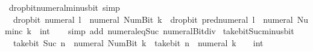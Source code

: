 \begin{isabellebody}
\endisatagproof
{\isafoldproof}%
%
\isadelimproof
\isanewline
%
\endisadelimproof
\isanewline
{}\isamarkupfalse%
\ drop{\isacharunderscore}{\kern0pt}bit{\isacharunderscore}{\kern0pt}numeral{\isacharunderscore}{\kern0pt}minus{\isacharunderscore}{\kern0pt}bit{}\ {\isacharbrackleft}{\kern0pt}simp{\isacharbrackright}{\kern0pt}{\isacharcolon}{\kern0pt}\isanewline
\ \ {\isacartoucheopen}drop{\isacharunderscore}{\kern0pt}bit\ {\isacharparenleft}{\kern0pt}numeral\ l{\isacharparenright}{\kern0pt}\ {\isacharparenleft}{\kern0pt}{\isacharminus}{\kern0pt}\ numeral\ {\isacharparenleft}{\kern0pt}Num{\isachardot}{\kern0pt}Bit{}\ k{\isacharparenright}{\kern0pt}{\isacharparenright}{\kern0pt}\ {\isacharequal}{\kern0pt}\ drop{\isacharunderscore}{\kern0pt}bit\ {\isacharparenleft}{\kern0pt}pred{\isacharunderscore}{\kern0pt}numeral\ l{\isacharparenright}{\kern0pt}\ {\isacharparenleft}{\kern0pt}{\isacharminus}{\kern0pt}\ numeral\ {\isacharparenleft}{\kern0pt}Num{\isachardot}{\kern0pt}inc\ k{\isacharparenright}{\kern0pt}\ {\isacharcolon}{\kern0pt}{\isacharcolon}{\kern0pt}\ int{\isacharparenright}{\kern0pt}{\isacartoucheclose}\isanewline
%
\isadelimproof
\ \ %
\endisadelimproof
%
\isatagproof
{}\isamarkupfalse%
\ {\isacharparenleft}{\kern0pt}simp\ add{\isacharcolon}{\kern0pt}\ numeral{\isacharunderscore}{\kern0pt}eq{\isacharunderscore}{\kern0pt}Suc\ numeral{\isacharunderscore}{\kern0pt}Bit{}{\isacharunderscore}{\kern0pt}div{\isacharunderscore}{\kern0pt}{}{\isacharparenright}{\kern0pt}%
\endisatagproof
{\isafoldproof}%
%
\isadelimproof
\isanewline
%
\endisadelimproof
\isanewline
{}\isamarkupfalse%
\ take{\isacharunderscore}{\kern0pt}bit{\isacharunderscore}{\kern0pt}Suc{\isacharunderscore}{\kern0pt}minus{\isacharunderscore}{\kern0pt}bit{}{\isacharcolon}{\kern0pt}\isanewline
\ \ {\isacartoucheopen}take{\isacharunderscore}{\kern0pt}bit\ {\isacharparenleft}{\kern0pt}Suc\ n{\isacharparenright}{\kern0pt}\ {\isacharparenleft}{\kern0pt}{\isacharminus}{\kern0pt}\ numeral\ {\isacharparenleft}{\kern0pt}Num{\isachardot}{\kern0pt}Bit{}\ k{\isacharparenright}{\kern0pt}{\isacharparenright}{\kern0pt}\ {\isacharequal}{\kern0pt}\ take{\isacharunderscore}{\kern0pt}bit\ n\ {\isacharparenleft}{\kern0pt}{\isacharminus}{\kern0pt}\ numeral\ k{\isacharparenright}{\kern0pt}\ {\isacharasterisk}{\kern0pt}\ {\isacharparenleft}{\kern0pt}{}\ {\isacharcolon}{\kern0pt}{\isacharcolon}{\kern0pt}\ int{\isacharparenright}{\kern0pt}{\isacartoucheclose}\isanewline
%
\isadelimproof
\ \ %
\endisadelimproof

\end{isabellebody}
